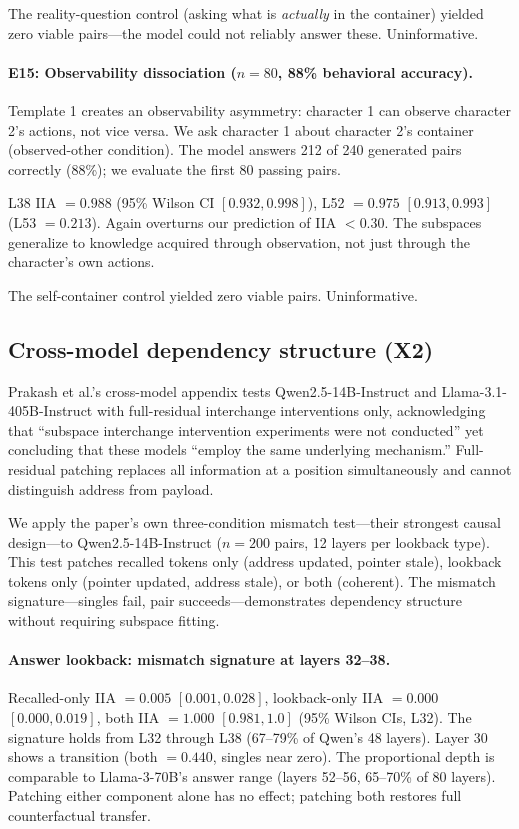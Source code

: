 \documentclass{article}
\begin{document}
The reality-question control (asking what is \emph{actually} in the container) yielded zero viable pairs---the model could not reliably answer these. Uninformative.

\paragraph{E15: Observability dissociation ($n = 80$, 88\% behavioral accuracy).}
Template 1 creates an observability asymmetry: character 1 can observe character 2's actions, not vice versa. We ask character 1 about character 2's container (observed-other condition). The model answers 212 of 240 generated pairs correctly (88\%); we evaluate the first 80 passing pairs.

L38 IIA $= 0.988$ (95\% Wilson CI $[0.932, 0.998]$), L52 $= 0.975$ $[0.913, 0.993]$ (L53 $= 0.213$). Again overturns our prediction of IIA $< 0.30$. The subspaces generalize to knowledge acquired through observation, not just through the character's own actions.

The self-container control yielded zero viable pairs. Uninformative.

\subsection{Cross-model dependency structure (X2)}
\label{sec:crossmodel}

Prakash et al.'s cross-model appendix tests Qwen2.5-14B-Instruct and Llama-3.1-405B-Instruct with full-residual interchange interventions only, acknowledging that ``subspace interchange intervention experiments were not conducted'' yet concluding that these models ``employ the same underlying mechanism.'' Full-residual patching replaces all information at a position simultaneously and cannot distinguish address from payload.

We apply the paper's own three-condition mismatch test---their strongest causal design---to Qwen2.5-14B-Instruct ($n = 200$ pairs, 12 layers per lookback type). This test patches recalled tokens only (address updated, pointer stale), lookback tokens only (pointer updated, address stale), or both (coherent). The mismatch signature---singles fail, pair succeeds---demonstrates dependency structure without requiring subspace fitting.

\paragraph{Answer lookback: mismatch signature at layers 32--38.}
Recalled-only IIA $= 0.005$ $[0.001, 0.028]$, lookback-only IIA $= 0.000$ $[0.000, 0.019]$, both IIA $= 1.000$ $[0.981, 1.0]$ (95\% Wilson CIs, L32). The signature holds from L32 through L38 (67--79\% of Qwen's 48 layers). Layer 30 shows a transition (both $= 0.440$, singles near zero). The proportional depth is comparable to Llama-3-70B's answer range (layers 52--56, 65--70\% of 80 layers). Patching either component alone has no effect; patching both restores full counterfactual transfer.
\end{document}
